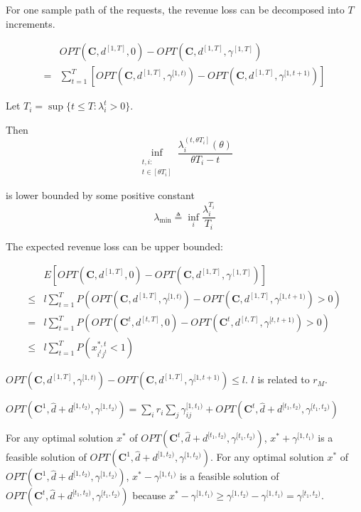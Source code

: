 For one sample path of the requests, the revenue loss can be decomposed into $T$ increments.

\begin{align*}
    & OPT(\bm{C}, d^{[1, T]}, 0) - OPT(\bm{C}, d^{[1, T]}, \gamma^{[1, T]}) \\
 = & \sum_{t=1}^{T} [OPT(\bm{C}, d^{[1,T]}, \gamma^{[1,t)}) - OPT(\bm{C}, d^{[1,T]}, \gamma^{[1,t+1)})]
\end{align*}


Let $T_{i} = \sup\{t \leq T: \lambda_{i}^{t}> 0\}$. 

Then 
$$
\inf_{\substack{t, i: \\ t \in\left[\theta T_{i}\right]}} \frac{\lambda_{i}^{\left(t, \theta T_{i}\right]}(\theta)}{\theta T_{i}-t}
$$

is lower bounded by some positive constant 
$$
\lambda_{\min } \triangleq \inf_{i} \frac{\lambda_{i}^{T_{i}}}{T_{i}}
$$


The expected revenue loss can be upper bounded:

\begin{align*}
    & E[OPT(\bm{C}, d^{[1, T]}, 0) - OPT(\bm{C}, d^{[1, T]}, \gamma^{[1, T]})] \\
 \leq & l \sum_{t=1}^{T} P(OPT(\bm{C}, d^{[1, T]}, \gamma^{[1,t)}) - OPT(\bm{C}, d^{[1, T]}, \gamma^{[1,t+1)}) > 0) \\
 = & l \sum_{t=1}^{T} P(OPT(\bm{C}^{t}, d^{[t, T]}, 0) - OPT(\bm{C}^{t}, d^{[t, T]}, \gamma^{[t,t+1)}) > 0) \\
 \leq & l \sum_{t=1}^{T} P(x_{i^{t}j^{t}}^{*,t} <1)
\end{align*}

$OPT(\bm{C}, d^{[1, T]}, \gamma^{[1,t)}) - OPT(\bm{C}, d^{[1, T]}, \gamma^{[1,t+1)}) \leq l$.
$l$ is related to $r_{M}$.

\begin{lem}\label{additive}
$OPT(\bm{C}^{1}, \hat{d} + d^{[1, t_2)} , \gamma^{[1, t_2)}) = \sum_{i} r_{i} \sum_{j} \gamma_{ij}^{[1, t_1)} + OPT(\bm{C}^{t}, \hat{d}+d^{[t_1, t_2)}, \gamma^{[t_1, t_2)})$
\end{lem}

For any optimal solution $x^{*}$ of $OPT(\bm{C}^{t}, \hat{d}+d^{[t_1, t_2)}, \gamma^{[t_1, t_2)})$, $x^{*} + \gamma^{[1, t_1)}$ is a feasible solution of $OPT(\bm{C}^{1}, \hat{d}+d^{[1, t_2)}, \gamma^{[1, t_2)})$. For any optimal solution $x^{*}$ of $OPT(\bm{C}^{1}, \hat{d}+d^{[1, t_2)}, \gamma^{[1, t_2)})$, $x^{*}- \gamma^{[1, t_1)}$ is a feasible solution of $OPT(\bm{C}^{t}, \hat{d}+d^{[t_1, t_2)}, \gamma^{[t_1, t_2)})$ because $x^{*}- \gamma^{[1, t_1)} \geq \gamma^{[1, t_{2})}- \gamma^{[1, t_1)} = \gamma^{[t_1, t_2)}$.


